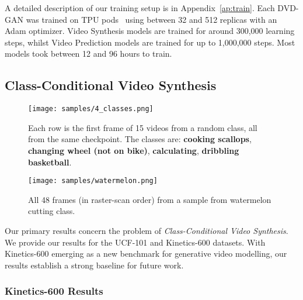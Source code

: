 \documentclass{article} \usepackage{iclr2020_conference,times}
\begin{document}
A detailed description of our training setup is in Appendix~\ref{ap:train}. Each DVD-GAN was trained on TPU pods~\citep{Google} using between 32 and 512 replicas with an Adam \citep{kingma2014adam} optimizer. Video Synthesis models are trained for around 300,000 learning steps, whilst Video Prediction models are trained for up to 1,000,000 steps.
Most models took between 12 and 96 hours to train. 

\subsection{Class-Conditional Video Synthesis}

\begin{figure}[t]
\centering
\texttt{[image: samples/4\_classes.png]}

\caption{Each row is the first frame of 15 videos from a random class, all from the same checkpoint. The classes are: \textbf{cooking scallops}, \textbf{changing wheel (not on bike)}, \textbf{calculating}, \textbf{dribbling basketball}.}
\label{fig:class_batches}
\end{figure}

\begin{figure}[t]
\centering
\texttt{[image: samples/watermelon.png]}

\caption{All 48 frames (in raster-scan order) from a  sample from watermelon cutting class.}
\label{fig:soccer_game}
\end{figure}


Our primary results concern the problem of \textit{Class-Conditional Video Synthesis}. 
We provide our results for the UCF-101 and Kinetics-600 datasets. With Kinetics-600 emerging as a new benchmark for generative video modelling, our results establish a strong baseline for future work.

\subsubsection{Kinetics-600 Results}
\end{document}
